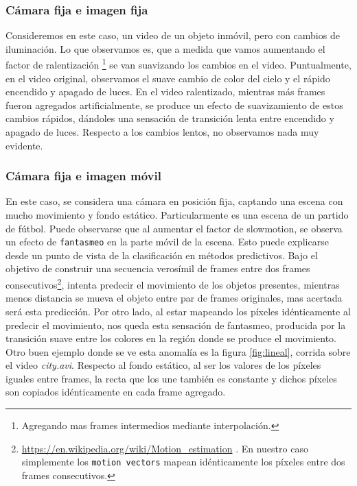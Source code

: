 \subsubsection{Cámara fija e imagen fija}
Consideremos en este caso, un video de un objeto inmóvil, pero con cambios de iluminación. Lo que observamos es, que a medida que vamos aumentando el factor de ralentización \footnote{Agregando mas frames intermedios mediante interpolación.} se van suavizando los cambios en el video. Puntualmente, en el video original, observamos el suave cambio de color del cielo y el rápido encendido y apagado de luces. En el video ralentizado, mientras más frames fueron agregados artificialmente, se produce un efecto de suavizamiento de estos cambios rápidos, dándoles una sensación de transición lenta entre encendido y apagado de luces. Respecto a los cambios lentos, no observamos nada muy evidente.

\subsubsection{Cámara fija e imagen móvil}
En este caso, se considera una cámara en posición fija, captando una escena con mucho movimiento y fondo estático. Particularmente es una escena de un partido de fútbol. Puede observarse que al aumentar el factor de slowmotion, se observa un efecto de \texttt{fantasmeo} en la parte móvil de la escena. Esto puede explicarse desde un punto de vista de la clasificación en métodos predictivos. Bajo el objetivo de construir una secuencia verosímil de frames entre dos frames consecutivos\footnote{\url{https://en.wikipedia.org/wiki/Motion_estimation} . En nuestro caso simplemente los \texttt{motion vectors} mapean idénticamente los píxeles entre dos frames consecutivos.}, intenta predecir el movimiento de los objetos presentes, mientras menos distancia se mueva el objeto entre par de frames originales, mas acertada será esta predicción. Por otro lado, al estar mapeando los píxeles idénticamente al predecir el movimiento, nos queda esta sensación de fantasmeo, producida por la transición suave entre los colores en la región donde se produce el movimiento. Otro buen ejemplo donde se ve esta anomalía es la figura \ref{fig:lineal}, corrida sobre el video \emph{city.avi}. Respecto al fondo estático, al ser los valores de los píxeles iguales entre frames, la recta que los une también es constante y dichos píxeles son copiados idénticamente en cada frame agregado.

